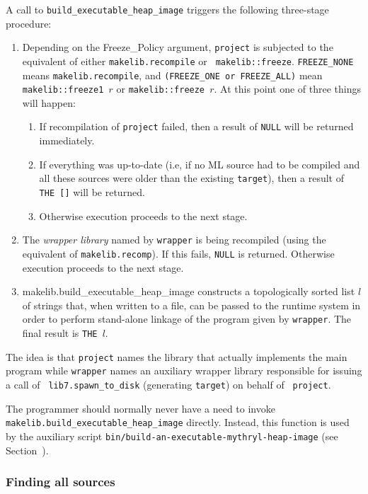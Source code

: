 A call to {\tt build_executable_heap_image} triggers the following three-stage
procedure:
\begin{enumerate}
\item Depending on the Freeze_Policy argument, {\tt project} is
subjected to the equivalent of either {\tt makelib.recompile} or {\tt
makelib::freeze}.  {\tt FREEZE_NONE} means {\tt makelib.recompile}, and {\tt (FREEZE_ONE or FREEZE_ALL)}
mean {\tt makelib::freeze1 $r$} or  {\tt makelib::freeze $r$}.
At this point one of three things will happen:
\begin{enumerate}
\item If recompilation of {\tt project}
failed, then a result of {\tt NULL} will be returned immediately.
\item If everything was up-to-date (i.e, if no ML source had to be compiled
and all these sources were older than the existing {\tt target}), then
a result of {\tt THE []} will be returned.
\item Otherwise execution proceeds to the next stage.
\end{enumerate}
\item The {\em wrapper library} named by {\tt wrapper} is being
recompiled (using the equivalent of {\tt makelib.recomp}).  If this
fails, {\tt NULL} is returned.  Otherwise execution proceeds to the
next stage.
\item {makelib.build_executable_heap_image} constructs a topologically sorted list $l$
of strings that, when written to a file, can be passed to the runtime
system in order to perform stand-alone linkage of the program given by
{\tt wrapper}.  The final result is {\tt THE $l$}.
\end{enumerate}

The idea is that {\tt project} names the library that actually
implements the main program while {\tt wrapper} names an auxiliary
wrapper library responsible for issuing a call of {\tt
lib7.spawn_to_disk} (generating {\tt target}) on behalf of {\tt
project}.

The programmer should normally never have a need to invoke {\tt
makelib.build_executable_heap_image} directly.  Instead, this function is used by
the auxiliary script {\tt bin/build-an-executable-mythryl-heap-image} (see
Section~).

\subsubsection{Finding all sources}
\label{sec:makedepend:support}

